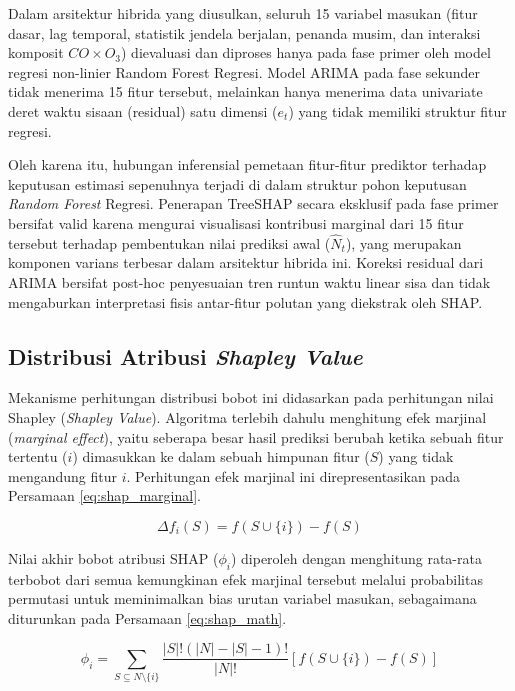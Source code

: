 Dalam arsitektur hibrida yang diusulkan, seluruh 15 variabel masukan (fitur dasar, lag temporal, statistik jendela berjalan, penanda musim, dan interaksi komposit $CO \times O_3$) dievaluasi dan diproses hanya pada fase primer oleh model regresi non-linier Random Forest Regresi. Model ARIMA pada fase sekunder tidak menerima 15 fitur tersebut, melainkan hanya menerima data univariate deret waktu sisaan (residual) satu dimensi ($e_t$) yang tidak memiliki struktur fitur regresi.

Oleh karena itu, hubungan inferensial pemetaan fitur-fitur prediktor terhadap keputusan estimasi sepenuhnya terjadi di dalam struktur pohon keputusan \textit{Random Forest} Regresi. Penerapan TreeSHAP secara eksklusif pada fase primer bersifat valid karena mengurai visualisasi kontribusi marginal dari 15 fitur tersebut terhadap pembentukan nilai prediksi awal ($\hat{N}_t$), yang merupakan komponen varians terbesar dalam arsitektur hibrida ini. Koreksi residual dari ARIMA bersifat post-hoc penyesuaian tren runtun waktu linear sisa dan tidak mengaburkan interpretasi fisis antar-fitur polutan yang diekstrak oleh SHAP.

\subsection{Distribusi Atribusi \textit{Shapley Value}}

Mekanisme perhitungan distribusi bobot ini didasarkan pada perhitungan nilai Shapley (\textit{Shapley Value}). Algoritma terlebih dahulu menghitung efek marjinal (\textit{marginal effect}), yaitu seberapa besar hasil prediksi berubah ketika sebuah fitur tertentu ($i$) dimasukkan ke dalam sebuah himpunan fitur ($S$) yang tidak mengandung fitur $i$. Perhitungan efek marjinal ini direpresentasikan pada Persamaan \ref{eq:shap_marginal}.

\begin{equation}
\Delta f_i(S) = f(S \cup \{i\}) - f(S)
\label{eq:shap_marginal}
\end{equation}

Nilai akhir bobot atribusi SHAP ($\phi_i$) diperoleh dengan menghitung rata-rata terbobot dari semua kemungkinan efek marjinal tersebut melalui probabilitas permutasi untuk meminimalkan bias urutan variabel masukan, sebagaimana diturunkan pada Persamaan \ref{eq:shap_math}.

\begin{equation}
\phi_i = \sum_{S \subseteq N \setminus \{i\}} \frac{|S|!(|N|-|S|-1)!}{|N|!} \left[ f(S \cup \{i\}) - f(S) \right]
\label{eq:shap_math}
\end{equation}

